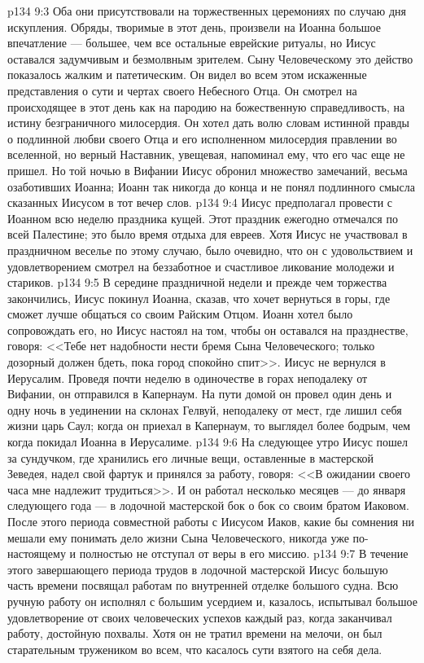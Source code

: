 \vs p134 9:3 Оба они присутствовали на торжественных церемониях по случаю дня искупления. Обряды, творимые в этот день, произвели на Иоанна большое впечатление --- большее, чем все остальные еврейские ритуалы, но Иисус оставался задумчивым и безмолвным зрителем. Сыну Человеческому это действо показалось жалким и патетическим. Он видел во всем этом искаженные представления о сути и чертах своего Небесного Отца. Он смотрел на происходящее в этот день как на пародию на божественную справедливость, на истину безграничного милосердия. Он хотел дать волю словам истинной правды о подлинной любви своего Отца и его исполненном милосердия правлении во вселенной, но верный Наставник, увещевая, напоминал ему, что его час еще не пришел. Но той ночью в Вифании Иисус обронил множество замечаний, весьма озаботивших Иоанна; Иоанн так никогда до конца и не понял подлинного смысла сказанных Иисусом в тот вечер слов.
\vs p134 9:4 Иисус предполагал провести с Иоанном всю неделю праздника кущей. Этот праздник ежегодно отмечался по всей Палестине; это было время отдыха для евреев. Хотя Иисус не участвовал в праздничном веселье по этому случаю, было очевидно, что он с удовольствием и удовлетворением смотрел на беззаботное и счастливое ликование молодежи и стариков.
\vs p134 9:5 В середине праздничной недели и прежде чем торжества закончились, Иисус покинул Иоанна, сказав, что хочет вернуться в горы, где сможет лучше общаться со своим Райским Отцом. Иоанн хотел было сопровождать его, но Иисус настоял на том, чтобы он оставался на празднестве, говоря: <<Тебе нет надобности нести бремя Сына Человеческого; только дозорный должен бдеть, пока город спокойно спит>>. Иисус не вернулся в Иерусалим. Проведя почти неделю в одиночестве в горах неподалеку от Вифании, он отправился в Капернаум. На пути домой он провел один день и одну ночь в уединении на склонах Гелвуй, неподалеку от мест, где лишил себя жизни царь Саул; когда он приехал в Капернаум, то выглядел более бодрым, чем когда покидал Иоанна в Иерусалиме.
\vs p134 9:6 На следующее утро Иисус пошел за сундучком, где хранились его личные вещи, оставленные в мастерской Зеведея, надел свой фартук и принялся за работу, говоря: <<В ожидании своего часа мне надлежит трудиться>>. И он работал несколько месяцев --- до января следующего года --- в лодочной мастерской бок о бок со своим братом Иаковом. После этого периода совместной работы с Иисусом Иаков, какие бы сомнения ни мешали ему понимать дело жизни Сына Человеческого, никогда уже по\hyp{}настоящему и полностью не отступал от веры в его миссию.
\vs p134 9:7 В течение этого завершающего периода трудов в лодочной мастерской Иисус большую часть времени посвящал работам по внутренней отделке большого судна. Всю ручную работу он исполнял с большим усердием и, казалось, испытывал большое удовлетворение от своих человеческих успехов каждый раз, когда заканчивал работу, достойную похвалы. Хотя он не тратил времени на мелочи, он был старательным тружеником во всем, что касалось сути взятого на себя дела.
